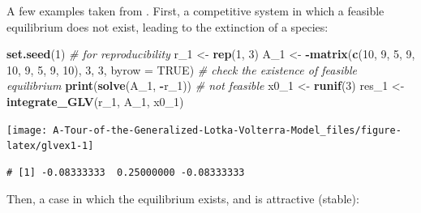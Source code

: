 \documentclass[
]{book}
\newenvironment{Shaded}{\begin{snugshade}}{\end{snugshade}}
\newcommand{\CommentTok}[1]{\textcolor[rgb]{0.56,0.35,0.01}{\textit{#1}}}
\newcommand{\DataTypeTok}[1]{\textcolor[rgb]{0.13,0.29,0.53}{#1}}
\newcommand{\DecValTok}[1]{\textcolor[rgb]{0.00,0.00,0.81}{#1}}
\newcommand{\KeywordTok}[1]{\textcolor[rgb]{0.13,0.29,0.53}{\textbf{#1}}}
\newcommand{\NormalTok}[1]{#1}
\newcommand{\OperatorTok}[1]{\textcolor[rgb]{0.81,0.36,0.00}{\textbf{#1}}}
\newcommand{\OtherTok}[1]{\textcolor[rgb]{0.56,0.35,0.01}{#1}}
\newcommand{\StringTok}[1]{\textcolor[rgb]{0.31,0.60,0.02}{#1}}
\begin{document}
A few examples taken from \citet{barabas2016effect}. First, a competitive system in which a feasible equilibrium does not exist, leading to the extinction of a species:

\begin{Shaded}
\begin{Highlighting}[]
\KeywordTok{set.seed}\NormalTok{(}\DecValTok{1}\NormalTok{) }\CommentTok{# for reproducibility}
\NormalTok{r_}\DecValTok{1}\NormalTok{ <-}\StringTok{ }\KeywordTok{rep}\NormalTok{(}\DecValTok{1}\NormalTok{, }\DecValTok{3}\NormalTok{)}
\NormalTok{A_}\DecValTok{1}\NormalTok{ <-}\StringTok{ }\OperatorTok{-}\KeywordTok{matrix}\NormalTok{(}\KeywordTok{c}\NormalTok{(}\DecValTok{10}\NormalTok{, }\DecValTok{9}\NormalTok{, }\DecValTok{5}\NormalTok{, }
                 \DecValTok{9}\NormalTok{, }\DecValTok{10}\NormalTok{, }\DecValTok{9}\NormalTok{, }
                 \DecValTok{5}\NormalTok{, }\DecValTok{9}\NormalTok{, }\DecValTok{10}\NormalTok{), }\DecValTok{3}\NormalTok{, }\DecValTok{3}\NormalTok{, }\DataTypeTok{byrow =} \OtherTok{TRUE}\NormalTok{)}
\CommentTok{# check the existence of feasible equilibrium}
\KeywordTok{print}\NormalTok{(}\KeywordTok{solve}\NormalTok{(A_}\DecValTok{1}\NormalTok{, }\OperatorTok{-}\NormalTok{r_}\DecValTok{1}\NormalTok{)) }\CommentTok{# not feasible}
\NormalTok{x0_}\DecValTok{1}\NormalTok{ <-}\StringTok{ }\KeywordTok{runif}\NormalTok{(}\DecValTok{3}\NormalTok{)}
\NormalTok{res_}\DecValTok{1}\NormalTok{ <-}\StringTok{ }\KeywordTok{integrate_GLV}\NormalTok{(r_}\DecValTok{1}\NormalTok{, A_}\DecValTok{1}\NormalTok{, x0_}\DecValTok{1}\NormalTok{)}
\end{Highlighting}
\end{Shaded}

\begin{center}\texttt{[image: A-Tour-of-the-Generalized-Lotka-Volterra-Model\_files/figure-latex/glvex1-1]} \end{center}

\begin{verbatim}
# [1] -0.08333333  0.25000000 -0.08333333
\end{verbatim}

Then, a case in which the equilibrium exists, and is attractive (stable):
\end{document}
